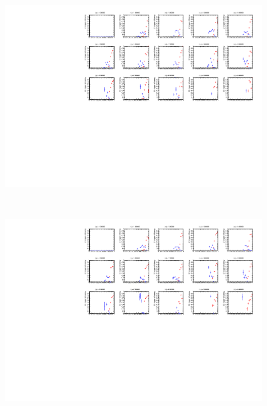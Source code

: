\begin{figure}[tbp]
\begin{minipage}{0.49\hsize}
    \end{minipage}
    \begin{minipage}{0.49\hsize}
    \centering   
    \includegraphics[width=\textwidth,page=15]{img/rec/stau_1000.pdf}
    \end{minipage}\\
    \begin{minipage}{0.49\hsize}
    \centering   
    \includegraphics[width=\textwidth,page=14]{img/rec/stau_600.pdf}
    \end{minipage}
    \begin{minipage}{0.49\hsize}
    \centering   

\end{minipage}
\end{figure}
